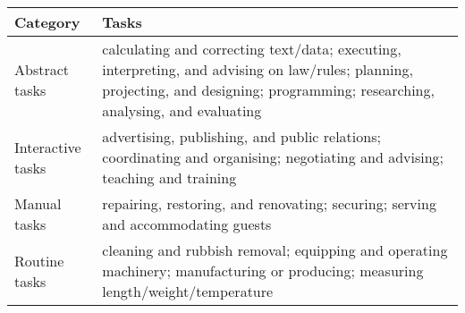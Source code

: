  \begin{tabular}{@{}ll@{}}
    \toprule
    \textbf{Category} & \textbf{Tasks} \\
    \midrule
    Abstract tasks & calculating and correcting text/data; executing, interpreting, and advising on law/rules; planning, projecting, and designing; programming; researching, analysing, and evaluating \\
    \addlinespace
    Interactive tasks & advertising, publishing, and public relations; coordinating and organising; negotiating and advising; teaching and training \\
    \addlinespace
    Manual tasks & repairing, restoring, and renovating; securing; serving and accommodating guests \\
    \addlinespace
    Routine tasks & cleaning and rubbish removal; equipping and operating machinery; manufacturing or producing; measuring length/weight/temperature \\
    \bottomrule
    \end{tabular}

    